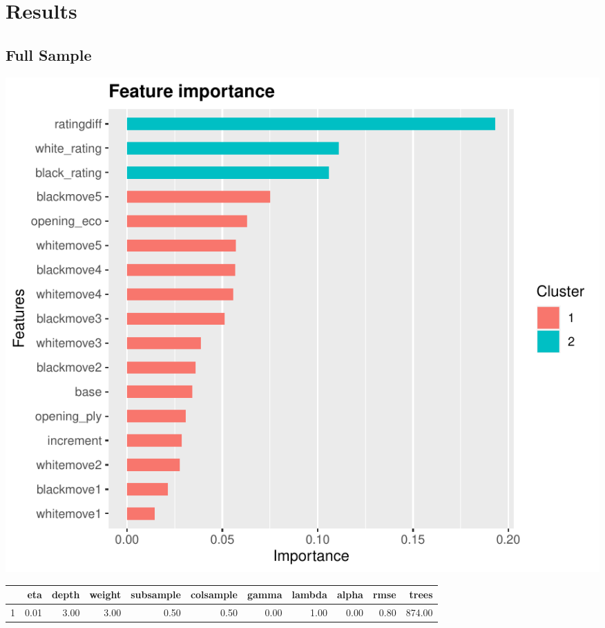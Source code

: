 \documentclass[12pt,preprint, authoryear]{elsarticle}
\let\origfigure\figure
\let\endorigfigure\endfigure
\renewenvironment{figure}[1][2] {
    \expandafter\origfigure\expandafter[H]
} {
    \endorigfigure
}
\let\origtable\table
\let\endorigtable\endtable
\renewenvironment{table}[1][2] {
    \expandafter\origtable\expandafter[H]
} {
    \endorigtable
}
\numberwithin{equation}{section}
\numberwithin{figure}{section}
\numberwithin{table}{section}
\begin{document}
\hypertarget{results}{%
\section{Results}\label{results}}

\hypertarget{full-sample}{%
\subsection{Full Sample}\label{full-sample}}

\begin{figure}[H]

{\centering \includegraphics{WriteUp_files/figure-latex/importfull1-1} 

}

\caption{Importance of Features for Untuned Model: Full Sample\label{Figure8}}\label{fig:importfull1}
\end{figure}

\begin{table}[H]
\centering
\begin{tabular}{rrrrrrrrrrr}
  \hline
 & eta & depth & weight & subsample & colsample& gamma & lambda & alpha & rmse & trees \\ 
  \hline
1 & 0.01 & 3.00 & 3.00 & 0.50 & 0.50 & 0.00 & 1.00 & 0.00 & 0.80 & 874.00 \\ 
   \hline
\end{tabular}
\caption{Hypergrid Full Sample} 
\end{table}
\end{document}
